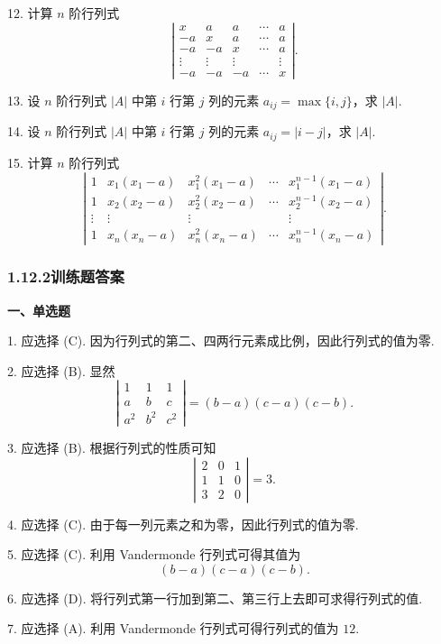 \documentclass[UTF8, 12pt, fontset=fandol, oneside]{ctexart}
\begin{document}
12. 计算 $n$ 阶行列式
\[
\left|\begin{array}{ccccc}
x&a&a&\cdots&a\\
-a&x&a&\cdots&a\\
-a&-a&x&\cdots&a\\
\vdots&\vdots&\vdots&&\vdots\\
-a&-a&-a&\cdots&x
\end{array}\right|.
\]

13. 设 $n$ 阶行列式 $|A|$ 中第 $i$ 行第 $j$ 列的元素 $a_{ij}=\max\{i,j\}$，求 $|A|$.

14. 设 $n$ 阶行列式 $|A|$ 中第 $i$ 行第 $j$ 列的元素 $a_{ij}=|i-j|$，求 $|A|$.

15. 计算 $n$ 阶行列式
\[
\left|\begin{array}{ccccc}
1&x_1(x_1-a)&x_1^2(x_1-a)&\cdots&x_1^{n-1}(x_1-a)\\
1&x_2(x_2-a)&x_2^2(x_2-a)&\cdots&x_2^{n-1}(x_2-a)\\
\vdots&\vdots&\vdots&&\vdots\\
1&x_n(x_n-a)&x_n^2(x_n-a)&\cdots&x_n^{n-1}(x_n-a)
\end{array}\right|.
\]

\subsubsection*{1.12.2\quad 训练题答案}

\noindent\textbf{一、单选题}

1. 应选择 (C). 因为行列式的第二、四两行元素成比例，因此行列式的值为零.

2. 应选择 (B). 显然
\[
\left|\begin{array}{ccc}
1&1&1\\
a&b&c\\
a^2&b^2&c^2
\end{array}\right|=(b-a)(c-a)(c-b).
\]

3. 应选择 (B). 根据行列式的性质可知
\[
\left|\begin{array}{ccc}
2&0&1\\
1&1&0\\
3&2&0
\end{array}\right|=3.
\]

4. 应选择 (C). 由于每一列元素之和为零，因此行列式的值为零.

5. 应选择 (C). 利用 Vandermonde 行列式可得其值为
\[
(b-a)(c-a)(c-b).
\]

6. 应选择 (D). 将行列式第一行加到第二、第三行上去即可求得行列式的值.

7. 应选择 (A). 利用 Vandermonde 行列式可得行列式的值为 $12$.
\end{document}
